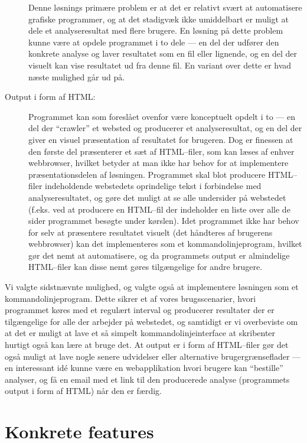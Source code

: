 \documentclass[a4paper,oneside]{memoir}
\begin{document}
\begin{description}
  Denne løsnings primære problem er at det er relativt svært at
  automatisere grafiske programmer, og at det stadigvæk ikke
  umiddelbart er muligt at dele et analyseresultat med flere
  brugere. En løsning på dette problem kunne være at opdele programmet
  i to dele --- en del der udfører den konkrete analyse og laver
  resultatet som en fil eller lignende, og en del der visuelt kan vise
  resultatet ud fra denne fil. En variant over dette er hvad næste
  mulighed går ud på.

\item[Output i form af HTML:]
  Programmet kan som foreslået ovenfor være konceptuelt opdelt i
  to --- en del der ``crawler'' et websted og producerer et
  analyseresultat, og en del der giver en visuel præsentation af
  resultatet for brugeren. Dog er finessen at den første del
  præsenterer et sæt af HTML--filer, som kan læses af enhver
  webbrowser, hvilket betyder at man ikke har behov for at implementere
  præsentationsdelen af løsningen. Programmet skal blot producere
  HTML--filer indeholdende webstedets oprindelige tekst i forbindelse
  med analyseresultatet, og gøre det muligt at se alle undersider på
  webstedet (f.eks. ved at producere en HTML--fil der indeholder en
  liste over alle de sider programmet besøgte under kørslen). Idet
  programmet ikke har behov for selv at præsentere resultatet visuelt
  (det håndteres af brugerens webbrowser) kan det implementeres som et
  kommandolinjeprogram, hvilket gør det nemt at automatisere, og da
  programmets output er almindelige HTML--filer kan disse nemt gøres
  tilgængelige for andre brugere.
\end{description}

Vi valgte sidstnævnte mulighed, og valgte også at implementere
løsningen som et kommandolinjeprogram. Dette sikrer et af vores
brugsscenarier, hvori programmet køres med et regulært interval og
producerer resultater der er tilgængelige for alle der arbejder på
webstedet, og samtidigt er vi overbeviste om at det er muligt at lave
et så simpelt kommandolinjeinterface at skribenter hurtigt også kan
lære at bruge det. At output er i form af HTML--filer gør det også
muligt at lave nogle senere udvidelser eller alternative
brugergrænseflader --- en interessant idé kunne være en webapplikation
hvori brugere kan ``bestille'' analyser, og få en email med et link
til den producerede analyse (programmets output i form af HTML) når
den er færdig.

\section{Konkrete features}
\end{document}

